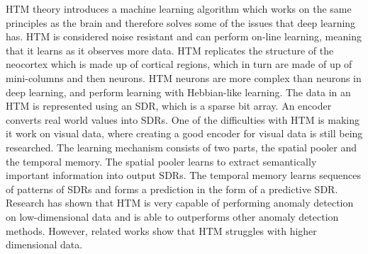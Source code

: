 HTM theory introduces a machine learning algorithm which works on the same principles as the brain and therefore solves some of the issues that deep learning has. HTM is considered noise resistant and can perform on-line learning, meaning that it learns as it observes more data. HTM replicates the structure of the neocortex which is made up of cortical regions, which in turn are made of up of mini-columns and then neurons. HTM neurons are more complex than neurons in deep learning, and perform learning with Hebbian-like learning. The data in an HTM is represented using an SDR, which is a sparse bit array. An encoder converts real world values into SDRs. One of the difficulties with HTM is making it work on visual data, where creating a good encoder for visual data is still being researched. The learning mechanism consists of two parts, the spatial pooler and the temporal memory. The spatial pooler learns to extract semantically important information into output SDRs. The temporal memory learns sequences of patterns of SDRs and forms a prediction in the form of a predictive SDR. Research has shown that HTM is very capable of performing anomaly detection on low-dimensional data and is able to outperforms other anomaly detection methods. However, related works show that HTM struggles with higher dimensional data.